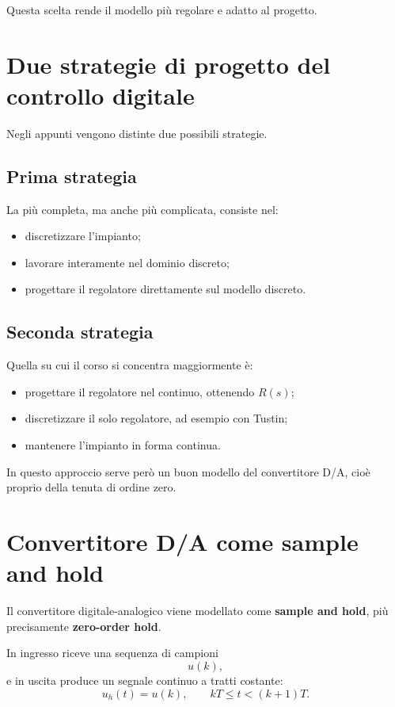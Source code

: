 Questa scelta rende il modello più regolare e adatto al progetto.

\section{Due strategie di progetto del controllo digitale}

Negli appunti vengono distinte due possibili strategie.

\subsection{Prima strategia}

La più completa, ma anche più complicata, consiste nel:
\begin{itemize}
    \item discretizzare l'impianto;
    \item lavorare interamente nel dominio discreto;
    \item progettare il regolatore direttamente sul modello discreto.
\end{itemize}

\subsection{Seconda strategia}

Quella su cui il corso si concentra maggiormente è:
\begin{itemize}
    \item progettare il regolatore nel continuo, ottenendo \(R(s)\);
    \item discretizzare il solo regolatore, ad esempio con Tustin;
    \item mantenere l'impianto in forma continua.
\end{itemize}

In questo approccio serve però un buon modello del convertitore D/A,
cioè proprio della tenuta di ordine zero.

\section{Convertitore D/A come sample and hold}

Il convertitore digitale-analogico viene modellato come \textbf{sample and hold},
più precisamente \textbf{zero-order hold}.

In ingresso riceve una sequenza di campioni
\[
u(k),
\]
e in uscita produce un segnale continuo a tratti costante:
\[
u_h(t)=u(k), \qquad kT \le t < (k+1)T.
\]

